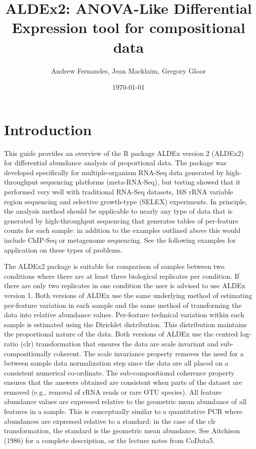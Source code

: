 \documentclass[11pt]{amsart}
\title{ALDEx2: ANOVA-Like Differential Expression tool for compositional data}
\author{Andrew Fernandes, Jean Macklaim, Gregory Gloor}
\date{\today}                                           %
\begin{document}
\maketitle

\section{Introduction}
This guide provides an overview of the R package ALDEx version 2 (ALDEx2) for differential abundance analysis of proportional data. The package was developed specifically for multiple-organism RNA-Seq data generated by high-throughput sequencing platforms (meta-RNA-Seq), but testing showed that it performed very well with traditional RNA-Seq datasets, 16S rRNA variable region sequencing and selective growth-type (SELEX) experiments. In principle, the analysis method should be applicable to nearly any type of data that is generated by high-throughput sequencing that generates tables of per-feature counts for each sample: in addition to the examples outlined above this would include  ChIP-Seq or metagenome sequencing. See the following examples for application on these types of problems.

The ALDEx2 package is suitable for comparison of samples between two conditions where there are at least three biological replicates per condition. If there are only two replicates in one condition the user is advised to use ALDEx version 1. Both versions of ALDEx use the same underlying method of estimating per-feature variation in each sample and the same method of transforming the data into relative abundance values. Per-feature technical variation within each sample is estimated using the Dirichlet distribution. This distribution maintains the proportional nature of the data. Both versions of ALDEx use the centred log-ratio (clr) transformation that ensures the data are scale invariant and sub-compositionally coherent\cite{Aitchison:1986}. The scale invariance property removes the need for a between sample data normalization step since the data are all placed on a consistent numerical co-ordinate. The sub-compositional coherence property ensures that the answers obtained are consistent when parts of the dataset are removed (e.g., removal of rRNA reads or rare OTU species). All feature abundance values are expressed relative to the geometric mean abundance of all features in a sample. This is conceptually similar to a quantitative PCR where abundances are expressed relative to a standard: in the case of the clr transformation, the standard is the geometric mean abundance. See Aitchison (1986)\cite{Aitchison:1986} for a complete description, or the lecture notes from CoData5\cite{aitchisonconcise}.
\end{document}
